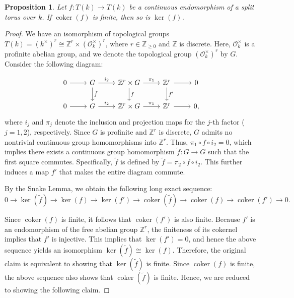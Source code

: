 \documentclass[12pt]{amsart}
\newtheorem{prop}[prop]{Proposition}
\theoremstyle{remark}
\renewcommand{\1}{{\mathbb{S}}}
\newcommand{\<}{\langle}
\renewcommand{\>}{\rangle}
\newcommand{\cok}{{\operatorname{coker}}}
\begin{document}
\begin{prop}\label{prop:torus2} Let $f:T(k)\to T(k)$ be a continuous endomorphism of a split torus over $k$. If $\cok(f)$ is finite, then so is $\ker(f)$. 
\end{prop}
	\begin{proof}

We have an isomorphism of topological groups $T(k) = (k^{\times})^{r} \cong \mathbb{Z}^{r} \times (\mathcal{O}_{k}^{\times})^{r}$, where $r \in \mathbb{Z}_{\geq 0}$ and $\mathbb{Z}$ is discrete. Here, $\mathcal{O}_{k}^{\times}$ is a profinite abelian group, and we denote the topological group $(\mathcal{O}_{k}^{\times})^{r}$ by $G$. Consider the following diagram:


\[
\begin{tikzcd}
0 \arrow[r] & G \arrow[r, "i_{2}"] \arrow[d, "\tilde{f}"] & \mathbb{Z}^{r} \times G \arrow[r, "\pi_{1}"] \arrow[d, "f"] & \mathbb{Z}^{r} \arrow[r] \arrow[d, "f'"] & 0 \\
0 \arrow[r] & G \arrow[r, "i_{2}"] & \mathbb{Z}^{r} \times G \arrow[r, "\pi_{1}"] & \mathbb{Z}^{r} \arrow[r] & 0,
\end{tikzcd}
\]
where $i_{j}$ and $\pi_{j}$ denote the inclusion and projection maps for the $j$-th factor ($j = 1, 2$), respectively. Since $G$ is profinite and $\mathbb{Z}^r$ is discrete, $G$ admits no nontrivial continuous group homomorphisms into $\mathbb{Z}^r$. Thus, $\pi_{1} \circ f \circ i_{2} = 0$, which implies there exists a continuous group homomorphism $\tilde{f} \colon G \to G$ such that the first square commutes. Specifically, $\tilde{f}$ is defined by $\tilde{f} = \pi_2 \circ f \circ i_2$. This further induces a map $f'$ that makes the entire diagram commute.

By the Snake Lemma, we obtain the following long exact sequence:
\[
0 \longrightarrow \ker(\tilde{f}) \longrightarrow \ker(f) \longrightarrow \ker(f') \longrightarrow \cok(\tilde{f}) \longrightarrow \cok(f) \longrightarrow \cok(f') \longrightarrow 0.
\]

Since $\cok(f)$ is finite, it follows that $\cok(f')$ is also finite. Because $f'$ is an endomorphism of the free abelian group $\mathbb{Z}^r$, the finiteness of its cokernel implies that $f'$ is injective. This implies that $\ker(f') = 0$, and hence the above sequence yields an isomorphism $\ker(\tilde{f}) \cong \ker(f)$. Therefore, the original claim is equivalent to showing that $\ker(\tilde{f})$ is finite. Since $\cok(f)$ is finite, the above sequence also shows that $\cok(\tilde{f})$ is finite. Hence, we are reduced to showing the following claim.




\end{proof}
\end{document}
